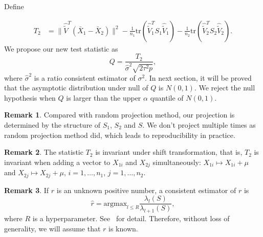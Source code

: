 \documentclass[review]{elsarticle}
\theoremstyle{plain}
\theoremstyle{definition}
\newtheorem{remark}{\quad\quad Remark}
\theoremstyle{remark}
\begin{document}
Define

\begin{equation*}
\begin{aligned}
    T_2&=\|\hat{\tilde{V}}^T(\bar{X}_1-\bar{X}_2)\|^2-\frac{1}{n_1}\mathrm{tr}(\hat{\tilde{V}}_1^T S_1\hat{\tilde{V}}_1)-\frac{1}{n_2}\mathrm{tr}(\hat{\tilde{V}}_2^T S_2\hat{\tilde{V}}_2).
\end{aligned}
\end{equation*}
We propose our new test statistic as
\begin{equation}\label{myTest}
    Q=\frac{T_2}{\hat{\sigma}^2\sqrt{2\tau^2 p}},
\end{equation}
where $\hat{\sigma}^2$ is a ratio consistent estimator of $\sigma^2$. In next section, it will be proved that the asymptotic distribution under null of $Q$ is $N(0,1)$. We reject the null hypothesis when $Q$ is larger than the upper $\alpha$ quantile of $N(0,1)$.

\begin{remark}
    Compared with random projection method, our projection is determined by the structure of $S_1$, $S_2$ and $S$.
    We don't  project multiple times as random projection method did, which leads to reproducibility in practice.
\end{remark}


\begin{remark} The statistic $T_2$ is invariant under shift transformation, that is, $T_2$ is invariant when adding a vector to $X_{1i}$ and $X_{2j}$ simultaneously: $X_{1i}\mapsto X_{1i}+\mu$ and $X_{2j}\mapsto X_{2j}+\mu$, $i=1,\ldots,n_1$, $j=1,\ldots,n_2$.
\end{remark}


\begin{remark}
If $r$ is an unknown positive number, a consistent estimator of $r$ is
\begin{equation}\label{estimateR}
    \hat{r}=\textrm{argmax}_{l\leq R}\frac{\lambda_l(S)}{\lambda_{l+1}(S)},
\end{equation}
where $R$ is a hyperparameter. See~\cite{Ahn2009Eigenvalue} for detail. Therefore, without loss of generality, we will assume that $r$ is known.
\end{remark}
\end{document}
